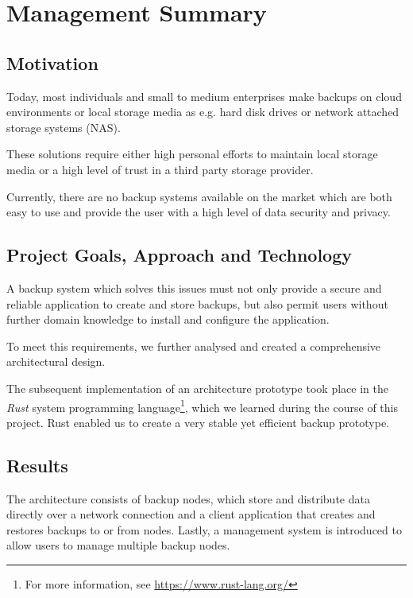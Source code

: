 \chapter{Management Summary}
\addchaptertocentry{\abstractname} %

\section*{Motivation} %
Today, most individuals and small to medium enterprises make backups on cloud environments or local storage media as e.g. hard disk drives or network attached storage systems (NAS).

These solutions require either high personal efforts to maintain local storage media or a high level of trust in a third party storage provider.

Currently, there are no backup systems available on the market which are both easy to use and provide the user with a high level of data security and privacy.

\section*{Project Goals, Approach and Technology}
A backup system which solves this issues must not only provide a secure and reliable application to create and store backups, but also permit users without further domain knowledge to install and configure the application.

To meet this requirements, we further analysed and created a comprehensive architectural design.

The subsequent implementation of an architecture prototype took place in the \emph{Rust} system programming language\footnote{For more information, see \url{https://www.rust-lang.org/}}, which we learned during the course of this project. Rust enabled us to create a very stable yet efficient backup prototype.

\section*{Results}
The architecture consists of backup nodes, which store and distribute data directly over a network connection and a client application that creates and restores backups to or from nodes. Lastly, a management system is introduced to allow users to manage multiple backup nodes.

